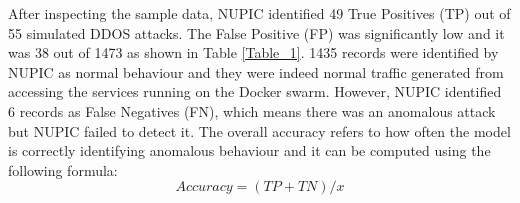 \documentclass[sigconf]{acmart}
\begin{document}
 \begin{table}[h!]
\centering

\caption{Results of the SNORT anomaly detection on confusion matrix}
\end{table}

 
 
 
After inspecting the sample data, NUPIC identified 49 True Positives (TP) out of 55 simulated DDOS attacks. The False Positive (FP) was significantly low and it was 38 out of 1473 as shown in Table \ref{Table_1}. 1435 records were identified by NUPIC as normal behaviour and they were indeed normal traffic generated from accessing the services running on the Docker swarm. However, NUPIC identified 6 records as False Negatives (FN), which means there was an anomalous attack but NUPIC failed to detect it. The overall accuracy refers to how often the model is correctly identifying anomalous behaviour and it can be computed using the following formula: 
\[ Accuracy=  (TP+TN)/x \]
\end{document}
